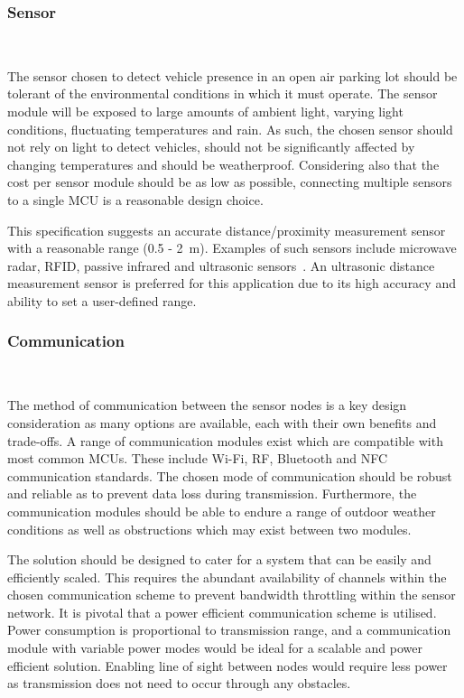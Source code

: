 \documentclass[10pt,twocolumn]{witseiepaper}
\begin{document}
		\subsubsection{Sensor} $   $
			
			The sensor chosen to detect vehicle presence in an open air parking lot should be tolerant of the environmental conditions in which it must operate. The sensor module will be exposed to large amounts of ambient light, varying light conditions, fluctuating temperatures and rain. As such, the chosen sensor should not rely on light to detect vehicles, should not be significantly affected by changing temperatures and should be weatherproof. Considering also that the cost per sensor module should be as low as possible, connecting multiple sensors to a single MCU is a reasonable design choice.
			
			This specification suggests an accurate distance/proximity measurement sensor with a reasonable range (0.5 - 2~m). Examples of such sensors include microwave radar, RFID, passive infrared and ultrasonic sensors~\cite{parkingSystem}. An ultrasonic distance measurement sensor is preferred for this application due to its high accuracy and ability to set a user-defined range.
			
		\subsubsection{Communication} $   $

			The method of communication between the sensor nodes is a key design consideration as many options are available, each with their own benefits and trade-offs. A range of communication modules exist which are compatible with most common MCUs. These include Wi-Fi, RF, Bluetooth and NFC communication standards. The chosen mode of communication should be robust and reliable as to prevent data loss during transmission. Furthermore, the communication modules should be able to endure a range of outdoor weather conditions as well as obstructions which may exist between two modules.

			The solution should be designed to cater for a system that can be easily and efficiently scaled. This requires the abundant availability of channels within the chosen communication scheme to prevent bandwidth throttling within the sensor network. It is pivotal that a power efficient communication scheme is utilised. Power consumption is proportional to transmission range, and a communication module with variable power modes would be ideal for a scalable and power efficient solution. Enabling line of sight between nodes would require less power as transmission does not need to occur through any obstacles.
			
\end{document}
